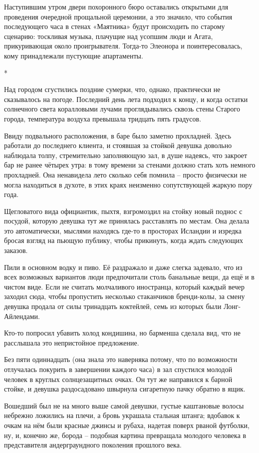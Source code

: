 \documentclass[
  a5paperpaper,
  DIV=11,
  numbers=noendperiod]{scrreprt}
\begin{document}

Наступившим утром двери похоронного бюро оставались открытыми для
проведения очередной прощальной церемонии, а это значило, что события
последующего часа в стенах «Маятника» будут происходить по старому
сценарию: тоскливая музыка, плачущие над усопшим люди и Агата,
прикуривающая около проигрывателя. Тогда-то Элеонора и поинтересовалась,
кому принадлежали пустующие апартаменты.

*

Над городом сгустились поздние сумерки, что, однако, практически не
сказывалось на погоде. Последний день лета подходил к концу, и когда
остатки солнечного света коралловыми лучами проглядывались сквозь стены
Старого города, температура воздуха превышала тридцать пять градусов.

Ввиду подвального расположения, в баре было заметно прохладней. Здесь
работали до последнего клиента, и стоявшая за стойкой девушка довольно
наблюдала толпу, стремительно заполняющую зал, в душе надеясь, что
закроет бар не ранее чётырех утра: в тому времени за стенами должно
стать хоть немного прохладней. Она ненавидела лето сколько себя помнила
-- просто физически не могла находиться в духоте, в этих краях неизменно
сопутствующей жаркую пору года.

Щегловатого вида официантик, пыхтя, взгромоздил на стойку новый поднос с
посудой, которую девушка тут же принялась расставлять по местам. Она
делала это автоматически, мыслями находясь где-то в просторах Исландии и
изредка бросая взгляд на пьющую публику, чтобы прикинуть, когда ждать
следующих заказов.

Пили в основном водку и пиво. Её раздражало и даже слегка задевало, что
из всех возможных вариантов люди предпочитали столь банальные вещи, да
ещё и в чистом виде. Если не считать молчаливого иностранца, который
каждый вечер заходил сюда, чтобы пропустить несколько стаканчиков
бренди-колы, за смену девушка продала от силы тринадцать коктейлей, семь
из которых были Лонг-Айлендами.

Кто-то попросил убавить холод кондишина, но барменша сделала вид, что не
расслышала это непристойное предложение.

Без пяти одиннадцать (она знала это наверняка потому, что по возможности
отлучалась покурить в завершении каждого часа) в зал спустился молодой
человек в круглых солнцезащитных очках. Он тут же направился к барной
стойке, и девушка раздосадовано швырнула сигаретную пачку обратно в
ящик.

Вошедший был не на много выше самой девушки, густые каштановые волосы
небрежно ложились на плечи, а бровь украшала стальная штанга; вдобавок к
очкам на нём были красные джинсы и рубаха, надетая поверх рваной
футболки, ну, и, конечно же, борода -- подобная картина превращала
молодого человека в представителя андерграундного поколения прошлого
века.
\end{document}
